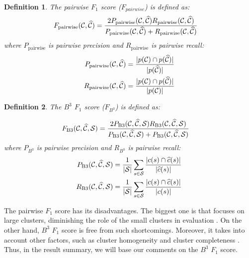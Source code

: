 \documentclass{pracamgr}
\newtheorem{mydef}{Definition}
\begin{document}
\begin{mydef}
The pairwise $F_{1}$ score ($F_{pairwise}$) is defined as:
\begin{align}
F_\text{pairwise}({\cal C}, \widehat{\cal C}) &= \frac{2 P_\text{pairwise}({\cal C}, \widehat{\cal C}) R_\text{pairwise}({\cal C}, \widehat{\cal C})}{P_\text{pairwise}({\cal C}, \widehat{\cal C}) + R_\text{pairwise}({\cal C}, \widehat{\cal C})}\label{eq:test}
\end{align}
where $P_\text{pairwise}$ is pairwise precision and $R_\text{pairwise}$ is pairwise recall:
\begin{align}
P_\text{pairwise}({\cal C}, \widehat{\cal C}) &= \frac{|p({\cal C}) \cap p(\widehat{\cal C})|}{|p(\widehat{\cal C})|}\\
R_\text{pairwise}({\cal C}, \widehat{\cal C}) &= \frac{|p({\cal C}) \cap p(\widehat{\cal C})|}{|p({\cal C})|}
\end{align}


\end{mydef}
\begin{mydef}


The $B^{3}$ $F_{1}$ score ($F_{B^{3}}$) is defined as:

\begin{align}
F_\text{B3}({\cal C}, \widehat{\cal C}, {\cal S}) &= \frac{2 P_\text{B3}({\cal C}, \widehat{\cal C}, {\cal S}) R_\text{B3}({\cal C}, \widehat{\cal C}, {\cal S})}{P_\text{B3}({\cal C}, \widehat{\cal C}, {\cal S}) + P_\text{B3}({\cal C}, \widehat{\cal C}, {\cal S})}
\end{align}
where $P_{B^{3}}$ is pairwise precision and $R_{B^{3}}$ is pairwise recall:
\begin{align}
P_\text{B3}({\cal C}, \widehat{\cal C}, {\cal S}) &= \frac{1}{|{\cal S}|} \sum_{s \in {\cal S}} \frac{|c(s) \cap \widehat{c}(s)|}{|\widehat{c}(s)|} \\
R_\text{B3}({\cal C}, \widehat{\cal C}, {\cal S}) &= \frac{1}{|{\cal S}|} \sum_{s \in {\cal S}} \frac{|c(s) \cap \widehat{c}(s)|}{|c(s)|}
\end{align}

\end{mydef}

The pairwise $F_{1}$ score has its disadvantages. The biggest one is that focuses on large
clusters, diminishing the role of the small clusters in evaluation \citep{Barnes15}.
On the other hand, $B^{3}$ $F_{1}$ score is free from such shortcomings.
Moreover, it takes into account other factors, such as cluster homogeneity and cluster completeness
\citep{Amigo2009}. Thus, in the result summary, we will base our comments on the $B^{3}$ $F_{1}$ score.
\end{document}
